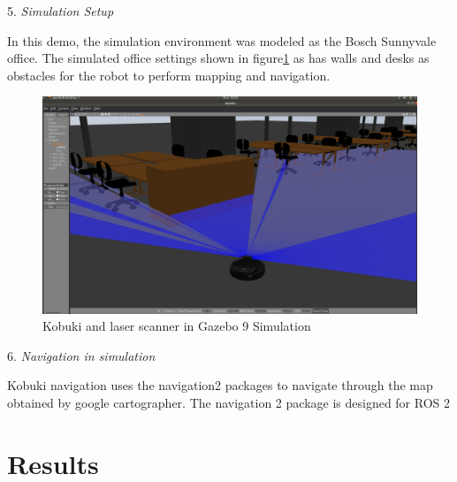\documentclass[letterpaper, 10 pt, conference]{ieeeconf}  %
\begin{document}
5. \textit{Simulation Setup} \par\vspace{5pt} 
In this demo, the simulation environment was modeled as the Bosch Sunnyvale office. The simulated office settings shown in figure\ref{fig:gazebo}  as has walls and desks as obstacles for the robot to perform mapping and navigation. \begin{figure}[ht]
  \includegraphics[width=\linewidth]{gazebo_simulation.png}
  \caption{Kobuki and laser scanner in Gazebo 9 Simulation } 
  \label{fig:gazebo}
\end{figure}
\par\vspace{5pt} 

6. \textit{Navigation in simulation} \par\vspace{5pt} 
Kobuki navigation uses the navigation2 packages to navigate through the map obtained by google cartographer. The navigation 2 package is designed for ROS 2 
\section{Results}\label{results}
\end{document}
